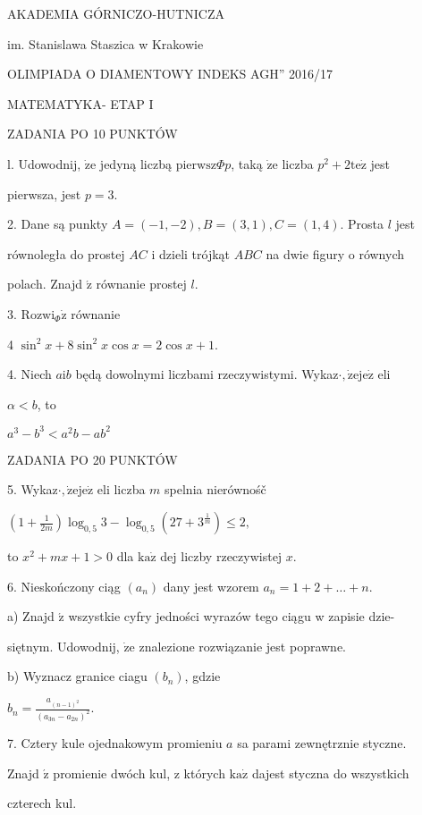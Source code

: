 \documentclass[a4paper,12pt]{article}
\begin{document}
AKADEMIA GÓRNICZO-HUTNICZA

im. Stanislawa Staszica w Krakowie

OLIMPIADA O DIAMENTOWY INDEKS AGH'' 2016/17

MATEMATYKA- ETAP I

ZADANIA PO 10 PUNKTÓW

l. Udowodnij, $\dot{\mathrm{z}}\mathrm{e}$ jedyną liczbą $\mathrm{p}\mathrm{i}\mathrm{e}\mathrm{r}\mathrm{w}\mathrm{s}\mathrm{z}\Phi p$, taką $\dot{\mathrm{z}}\mathrm{e}$ liczba $p^{2}+2\mathrm{t}\mathrm{e}\dot{\mathrm{z}}$ jest

pierwsza, jest $p=3.$

2. Dane są punkty $A = (-1,-2), B = (3,1), C = (1,4)$. Prosta $l$ jest

równoległa do prostej $AC$ i dzieli trójkąt $ABC$ na dwie figury o równych

polach. Znajd $\acute{\mathrm{z}}$ równanie prostej $l.$

3. $\mathrm{R}\mathrm{o}\mathrm{z}\mathrm{w}\mathrm{i}_{\Phi}\dot{\mathrm{z}}$ równanie

4 $\sin^{2}x+8\sin^{2}x\cos x=2\cos x+1.$

4. Niech $a\mathrm{i}b$ będą dowolnymi liczbami rzeczywistymi. Wykaz$\cdot, \dot{\mathrm{z}}\mathrm{e}\mathrm{j}\mathrm{e}\dot{\mathrm{z}}$ eli

$\alpha<b$, to

$a^{3}-b^{3}<a^{2}b-ab^{2}$

ZADANIA PO 20 PUNKTÓW

5. Wykaz$\cdot, \dot{\mathrm{z}}\mathrm{e}\mathrm{j}\mathrm{e}\dot{\mathrm{z}}$ eli liczba $m$ spelnia nierównośč

$(1+\displaystyle \frac{1}{2m})\log_{0,5}3-\log_{0,5}(27+3^{\frac{1}{m}})\leq 2,$

to $x^{2}+mx+1>0$ dla $\mathrm{k}\mathrm{a}\dot{\mathrm{z}}$ dej liczby rzeczywistej $x.$

6. Nieskończony ciąg $(a_{n})$ dany jest wzorem $a_{n}=1+2+\ldots+n.$

a) Znajd $\acute{\mathrm{z}}$ wszystkie cyfry jedności wyrazów tego ciągu w zapisie dzie-

siętnym. Udowodnij, $\dot{\mathrm{z}}\mathrm{e}$ znalezione rozwiązanie jest poprawne.

b) Wyznacz granice ciagu $(b_{n})$, gdzie

$b_{n}=\displaystyle \frac{a_{(n-1)^{2}}}{(a_{3n}-a_{2n})^{2}}.$

7. Cztery kule ojednakowym promieniu $a$ sa parami zewnętrznie styczne.

Znajd $\acute{\mathrm{z}}$ promienie dwóch kul, z których $\mathrm{k}\mathrm{a}\dot{\mathrm{z}}$ dajest styczna do wszystkich

czterech kul.
\end{document}
